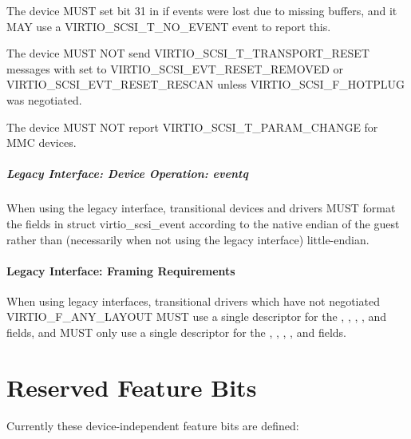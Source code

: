 The device MUST set bit 31 in  if events were lost due to
missing buffers, and it MAY use a VIRTIO_SCSI_T_NO_EVENT event to report
this.

The device MUST NOT send VIRTIO_SCSI_T_TRANSPORT_RESET messages
with  set to VIRTIO_SCSI_EVT_RESET_REMOVED or
VIRTIO_SCSI_EVT_RESET_RESCAN unless VIRTIO_SCSI_F_HOTPLUG was negotiated.

The device MUST NOT report VIRTIO_SCSI_T_PARAM_CHANGE for MMC devices.

\paragraph{Legacy Interface: Device Operation: eventq}\label{sec:Device Types / SCSI Host Device / Device Operation / Device Operation: eventq / Legacy Interface: Device Operation: eventq}
When using the legacy interface, transitional devices and drivers
MUST format the fields in struct virtio_scsi_event
according to the native endian of the guest rather than
(necessarily when not using the legacy interface) little-endian.

\subsubsection{Legacy Interface: Framing Requirements}\label{sec:Device
Types / SCSI Host Device / Legacy Interface: Framing Requirements}

When using legacy interfaces, transitional drivers which have not
negotiated VIRTIO_F_ANY_LAYOUT MUST use a single descriptor for the
, , , ,
 and  fields, and MUST only use a single
descriptor for the , ,
, ,  and
 fields.















\chapter{Reserved Feature Bits}\label{sec:Reserved Feature Bits}

Currently these device-independent feature bits are defined:

